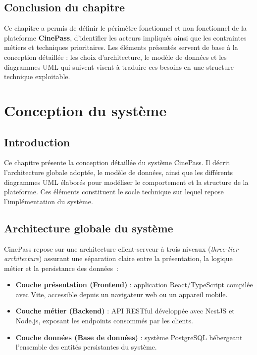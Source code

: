 \documentclass[12pt]{report}
\begin{document}
\section{Conclusion du chapitre}

Ce chapitre a permis de définir le périmètre fonctionnel et non fonctionnel de la plateforme \textbf{CinePass}, d'identifier les acteurs impliqués ainsi que les contraintes métiers et techniques prioritaires. Les éléments présentés servent de base à la conception détaillée : les choix d'architecture, le modèle de données et les diagrammes UML qui suivent visent à traduire ces besoins en une structure technique exploitable.

\chapter{Conception du système}

\section{Introduction}

Ce chapitre présente la conception détaillée du système CinePass. Il décrit l'architecture
globale adoptée, le modèle de données, ainsi que les différents diagrammes UML élaborés
pour modéliser le comportement et la structure de la plateforme. Ces éléments constituent
le socle technique sur lequel repose l'implémentation du système.

\section{Architecture globale du système}

CinePass repose sur une architecture client-serveur à trois niveaux
(\textit{three-tier architecture}) assurant une séparation claire entre la
présentation, la logique métier et la persistance des données~:

\begin{itemize}
    \item \textbf{Couche présentation (Frontend)} : application React/TypeScript
          compilée avec Vite, accessible depuis un navigateur web ou un appareil mobile.
    \item \textbf{Couche métier (Backend)} : API RESTful développée avec NestJS et
          Node.js, exposant les endpoints consommés par les clients.
    \item \textbf{Couche données (Base de données)} : système PostgreSQL hébergeant
          l'ensemble des entités persistantes du système.
\end{itemize}
\end{document}
